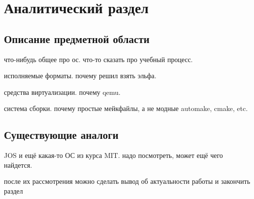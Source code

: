 \chapter{Аналитический раздел}
\label{cha:analysis}

\section{Описание предметной области}
что-нибудь общее про ос. что-то сказать про учебный процесс.

исполняемые форматы. почему решил взять эльфа.

средства виртуализации. почему qemu.

система сборки. почему простые мейкфайлы, а не модные automake, cmake, etc.

\section{Существующие аналоги}
JOS и ещё какая-то ОС из курса MIT. надо посмотреть, может ещё чего найдется.

после их рассмотрения можно сделать вывод об актуальности работы и закончить
раздел
